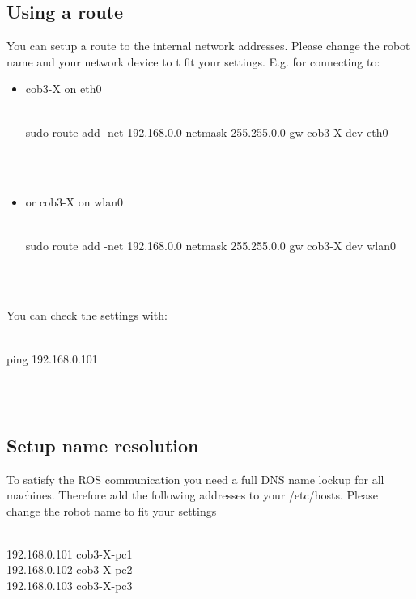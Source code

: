 \subsection{Using a route}
You can setup a route to the internal network addresses. Please change the robot name and your network device to t fit your settings. E.g. for connecting to:
\begin{itemize}
\item cob3-X on eth0
\\
\\   \colorbox{light-gray}{
         \begin{minipage}{1.0\textwidth} 
		sudo route add -net 192.168.0.0 netmask 255.255.0.0 gw cob3-X dev eth0
         \end{minipage}  } \\
	\\

\item or cob3-X on wlan0
\\
\\   \colorbox{light-gray}{
         \begin{minipage}{1.0\textwidth} 
		sudo route add -net 192.168.0.0 netmask 255.255.0.0 gw cob3-X dev wlan0
         \end{minipage}  } \\
	\\

\end{itemize}
You can check the settings with: \\
\\   \colorbox{light-gray}{
         \begin{minipage}{1.0\textwidth} 
		ping 192.168.0.101
         \end{minipage}  } \\
	\\

\subsection{Setup name resolution} 
To satisfy the ROS communication you need a full DNS name lockup for all machines. Therefore add the following addresses to your /etc/hosts. Please change the robot name to fit your settings 
\\
\\ \colorbox{light-gray}{
         \begin{minipage}{1.0\textwidth} 
		192.168.0.101 cob3-X-pc1\\
		192.168.0.102 cob3-X-pc2\\
		192.168.0.103 cob3-X-pc3
         \end{minipage} }

